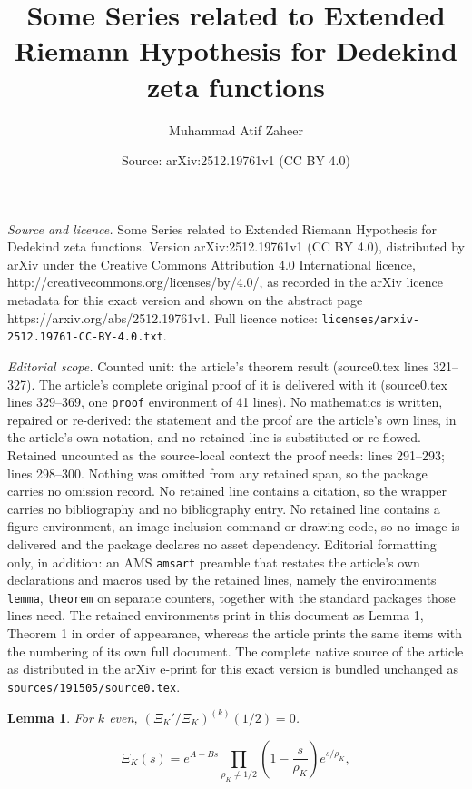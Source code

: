 \documentclass[10pt,a4paper]{amsart}
\title{Some Series related to Extended Riemann Hypothesis for Dedekind zeta functions}
\author{Muhammad Atif Zaheer}
\date{Source: arXiv:2512.19761v1 (CC BY 4.0)}
\newtheorem{lemma}{Lemma}
\begin{document}
\maketitle

\noindent\emph{Source and licence.} Some Series related to Extended Riemann Hypothesis for Dedekind zeta functions. Version arXiv:2512.19761v1 (CC BY 4.0), distributed by arXiv under the Creative Commons Attribution 4.0 International licence, http://creativecommons.org/licenses/by/4.0/, as recorded in the arXiv licence metadata for this exact version and shown on the abstract page https://arxiv.org/abs/2512.19761v1. Full licence notice: \texttt{licenses/arxiv-2512.19761-CC-BY-4.0.txt}.\par\smallskip

\noindent\textit{Editorial scope.} Counted unit: the article's theorem result (source0.tex lines 321--327). The article's complete original proof of it is delivered with it (source0.tex lines 329--369, one \texttt{proof} environment of 41 lines). No mathematics is written, repaired or re-derived: the statement and the proof are the article's own lines, in the article's own notation, and no retained line is substituted or re-flowed.  Retained uncounted as the source-local context the proof needs: lines 291--293; lines 298--300.  Nothing was omitted from any retained span, so the package carries no omission record.  No retained line contains a citation, so the wrapper carries no bibliography and no bibliography entry.  No retained line contains a figure environment, an image-inclusion command or drawing code, so no image is delivered and the package declares no asset dependency.  Editorial formatting only, in addition: an AMS \texttt{amsart} preamble that restates the article's own declarations and macros used by the retained lines, namely the environments \texttt{lemma}, \texttt{theorem} on separate counters, together with the standard packages those lines need.  The retained environments print in this document as Lemma 1, Theorem 1 in order of appearance, whereas the article prints the same items with the numbering of its own full document.  The complete native source of the article as distributed in the arXiv e-print for this exact version is bundled unchanged as \texttt{sources/191505/source0.tex}.
\begin{lemma} \label{vanishing of X_K at 1/2} 
For $k$ even, $(\Xi_K'/\Xi_K)^{(k)}(1/2) = 0$.
\end{lemma}

\begin{equation} \label{hadamard product}
\Xi_K(s) = e^{A + Bs} \prod_{\rho_K \neq 1/2} \left( 1 - \frac{s}{\rho_K} \right) e^{s/\rho_K},
\end{equation}
\end{document}
